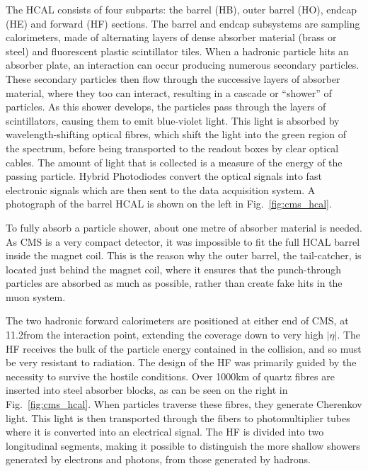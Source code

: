 The HCAL consists of four subparts: the barrel (HB), outer barrel (HO), endcap (HE) and forward
(HF) sections. The barrel and endcap subsystems are sampling calorimeters, made of alternating
layers of dense absorber material (brass or steel) and fluorescent plastic scintillator tiles.
When a hadronic particle hits an absorber plate, an interaction can occur producing numerous
secondary particles. These secondary particles then flow through the successive layers of absorber
material, where they too can interact, resulting in a cascade or “shower” of particles.
As this shower develops, the particles pass through the layers of scintillators, causing them to
emit blue-violet light. This light is absorbed by wavelength-shifting optical fibres, which shift
the light into the green region of the spectrum, before being transported to the readout boxes by
clear optical cables. The amount of light that is collected is a measure of the energy of the
passing particle. Hybrid Photodiodes convert the optical signals into fast electronic signals which
are then sent to the data acquisition system. A photograph of the barrel HCAL is shown on the left
in Fig.~\ref{fig:cms_hcal}. 

To fully absorb a particle shower, about one metre of absorber material is needed. As CMS is a
very compact detector, it was impossible to fit the full HCAL barrel inside the magnet coil. This
is the reason why the outer barrel, the tail-catcher, is located just behind the magnet coil, where
it ensures that the punch-through particles are absorbed as much as possible, rather than create
fake hits in the muon system. 

The two hadronic forward calorimeters are positioned at either end of CMS, at 11.2\meter from
the interaction point, extending the coverage down to very high $|\eta|$. 
The HF receives the bulk of the particle energy contained in the collision, and so must be very
resistant to radiation. The design of the HF was primarily guided by the necessity to survive the
hostile conditions. Over 1000\unit{km} of quartz fibres are inserted into steel absorber
blocks, as can be seen on the right in Fig.~\ref{fig:cms_hcal}. 
When particles traverse these fibres, they generate Cherenkov light. This light is then
transported through the fibers to photomultiplier tubes where it is converted into an electrical
signal. 
The HF is divided into two longitudinal segments, making it possible to distinguish the more shallow
showers generated by electrons and photons, from those generated by hadrons.

